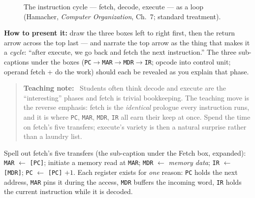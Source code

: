 \documentclass[11pt]{article}
\newenvironment{teachingaside}{\begin{quote}\small\color{primary-gold}\textbf{Teaching note:}\ }{\end{quote}}
\begin{document}
\begin{figure}[h]
  \centering
  \caption{The instruction cycle --- fetch, decode, execute --- as a loop (Hamacher, \textit{Computer Organization}, Ch.~7; standard treatment).}
  \label{fig:instruction-cycle}
\end{figure}

\textbf{How to present it:} draw the three boxes left to right first, then the return arrow across the top last --- and narrate the top arrow as the thing that makes it a \emph{cycle}: ``after execute, we go back and fetch the next instruction.'' The three sub-captions under the boxes (\texttt{PC}$\to$\texttt{MAR}$\to$\texttt{MDR}$\to$\texttt{IR}; opcode into control unit; operand fetch + do the work) should each be revealed as you explain that phase.

\begin{teachingaside}
Students often think decode and execute are the ``interesting'' phases and fetch is trivial bookkeeping. The teaching move is the reverse emphasis: fetch is the \emph{identical} prologue every instruction runs, and it is where \texttt{PC}, \texttt{MAR}, \texttt{MDR}, \texttt{IR} all earn their keep at once. Spend the time on fetch's five transfers; execute's variety is then a natural surprise rather than a laundry list.
\end{teachingaside}

Spell out fetch's five transfers (the sub-caption under the Fetch box, expanded): \texttt{MAR} $\gets$ \texttt{[PC]}; initiate a memory read at \texttt{MAR}; \texttt{MDR} $\gets$ \emph{memory data}; \texttt{IR} $\gets$ \texttt{[MDR]}; \texttt{PC} $\gets$ \texttt{[PC]} $+1$. Each register exists for \emph{one} reason: \texttt{PC} holds the next address, \texttt{MAR} pins it during the access, \texttt{MDR} buffers the incoming word, \texttt{IR} holds the current instruction while it is decoded.
\end{document}
